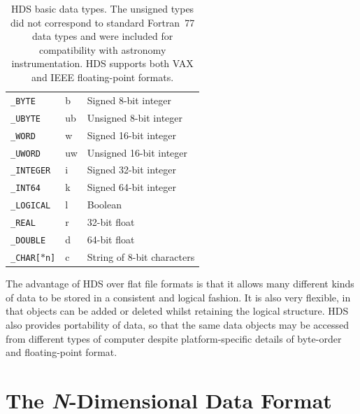 \documentclass[final,authoryear,5p,times,twocolumn]{elsarticle}
\begin{document}
\begin{table}
\caption{HDS basic data types. The unsigned types did not correspond
  to standard Fortran~77 data types and were included for
  compatibility with astronomy instrumentation. HDS supports both VAX
  and IEEE floating-point formats.}
\label{tab:hdstypes}
\begin{center}
\begin{tabular}{lll}
\hline
\texttt{\_BYTE} & b & Signed 8-bit integer \\
\texttt{\_UBYTE} & ub & Unsigned 8-bit integer \\
\texttt{\_WORD} & w & Signed 16-bit integer \\
\texttt{\_UWORD} & uw & Unsigned 16-bit integer \\
\texttt{\_INTEGER} & i & Signed 32-bit integer \\
\texttt{\_INT64} & k &Signed 64-bit integer \\
\texttt{\_LOGICAL} & l & Boolean \\
\texttt{\_REAL} & r & 32-bit float \\
\texttt{\_DOUBLE} & d & 64-bit float \\
\texttt{\_CHAR[$*$n]} & c & String of 8-bit characters \\
\hline
\end{tabular}
\end{center}
\end{table}

The advantage of HDS over flat file formats is that it allows many different kinds of data to
be stored in a consistent and logical fashion. It is also very
flexible, in that objects can be added or deleted whilst retaining the
logical structure.  HDS also provides portability of data, so that the
same data objects may be accessed from different types of computer
despite platform-specific details of byte-order and floating-point format.

\section{The \emph{N}-Dimensional Data Format}
\label{sec:ndf}
\end{document}
